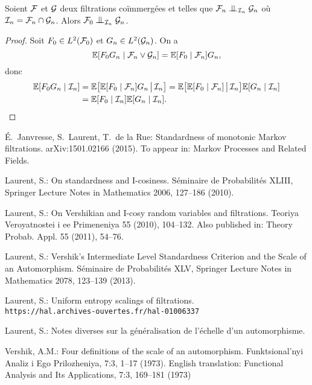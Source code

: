\documentclass[12pt,a4paper]{article}
\begin{document}
\begin{appendices}
\begin{lemme}
Soient $\mathcal{F}$ et $\mathcal{G}$ deux filtrations co\"immergées et telles que 
$\FF_{n} \indep_{\II_{n}} \GG_{n}$ où $\mathcal{I}_{n} = \mathcal{F}_{n} \cap \mathcal{G}_{n}$. 
Alors  $\FF_{0} \indep_{\II_{n}} \GG_{n}$.  
\end{lemme}

\begin{proof}
Soit $F_0 \in L^2(\mathcal{F}_0)$ et $G_n \in L^2(\mathcal{G}_n)$. On a 
$$
\mathbb{E}[F_0G_n \mid \mathcal{F}_n \vee \mathcal{G}_n] = \mathbb{E}[F_0 \mid \mathcal{F}_n] G_n,
$$
donc 
\begin{align*}
\mathbb{E}[F_0G_n \mid \mathcal{I}_n] & = 
\mathbb{E}\bigl[\mathbb{E}[F_0 \mid \mathcal{F}_n] G_n \,\big\vert\, \mathcal{I}_n \bigr] 
= \mathbb{E}\bigl[\mathbb{E}[F_0 \mid \mathcal{F}_n] \,\big\vert\, \mathcal{I}_n \bigr] \mathbb{E}[G_n \mid \mathcal{I}_n ] \\
& = \mathbb{E}[F_0 \mid \mathcal{I}_n]  \mathbb{E}[G_n \mid \mathcal{I}_n ].
\end{align*}
\end{proof}

\end{appendices}

\begin{thebibliography}{99.}

\'E.~Janvresse, S.~Laurent, T.~de la Rue: 
Standardness of monotonic Markov filtrations. 
	arXiv:1501.02166 (2015). 
To appear in: Markov Processes and Related Fields. 

 Laurent, S.: 
On standardness and I-cosiness. S\'eminaire de Probabilit\'es XLIII, 
Springer Lecture Notes in Mathematics 2006, 
127--186 (2010).

 Laurent, S.: 
On Vershikian and I-cosy random variables and filtrations.
Teoriya Veroyatnostei i ee Primeneniya 55 (2010), 104--132. 
Also published in: Theory Probab. Appl. 55 (2011), 54--76.


Laurent, S.: 
Vershik's Intermediate Level Standardness Criterion and the Scale of an Automorphism. 
S\'eminaire de Probabilit\'es XLV,
Springer Lecture Notes in Mathematics 2078,
123--139 (2013).

Laurent, S.: 
Uniform entropy scalings of filtrations. \\
\verb+https://hal.archives-ouvertes.fr/hal-01006337+ 

Laurent, S.: 
Notes diverses sur la généralisation de l'échelle d'un automorphisme. 

Vershik, A.M.: 
Four definitions of the scale of an automorphism. 
Funktsional'nyi Analiz i Ego Prilozheniya, 7:3, 
1--17 (1973). 
English translation:    
Functional Analysis and Its Applications, 7:3, 169--181 (1973)


\end{thebibliography}
\end{document}

